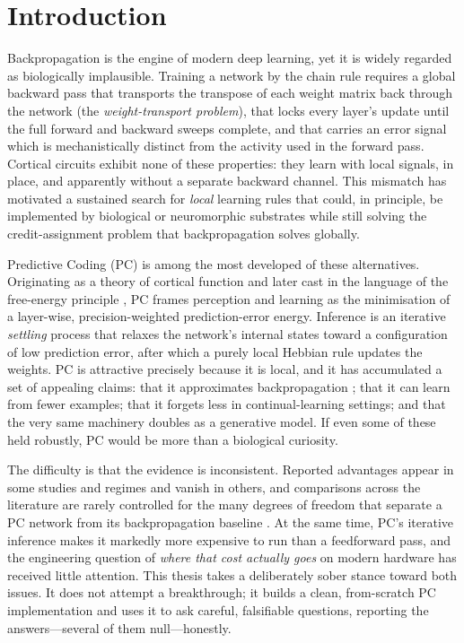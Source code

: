 \chapter{Introduction}\label{ch:intro}

Backpropagation is the engine of modern deep learning, yet it is widely regarded as
biologically implausible. Training a network by the chain rule requires a global backward pass
that transports the transpose of each weight matrix back through the network (the
\emph{weight-transport problem}), that locks every layer's update until the full forward and
backward sweeps complete, and that carries an error signal which is mechanistically distinct
from the activity used in the forward pass. Cortical circuits exhibit none of these properties:
they learn with local signals, in place, and apparently without a separate backward channel.
This mismatch has motivated a sustained search for \emph{local} learning rules that could, in
principle, be implemented by biological or neuromorphic substrates while still solving the
credit-assignment problem that backpropagation solves globally.

Predictive Coding (PC) is among the most developed of these alternatives. Originating as a
theory of cortical function \citep{rao1999predictive} and later cast in the language of the
free-energy principle \citep{bogacz2017tutorial}, PC frames perception and learning as the
minimisation of a layer-wise, precision-weighted prediction-error energy. Inference is an
iterative \emph{settling} process that relaxes the network's internal states toward a
configuration of low prediction error, after which a purely local Hebbian rule updates the
weights. PC is attractive precisely because it is local, and it has accumulated a set of
appealing claims: that it approximates backpropagation \citep{whittington2017approximation};
that it can learn from fewer examples; that it forgets less in continual-learning settings; and
that the very same machinery doubles as a generative model. If even some of these held robustly,
PC would be more than a biological curiosity.

The difficulty is that the evidence is inconsistent. Reported advantages appear in some studies
and regimes and vanish in others, and comparisons across the literature are rarely controlled
for the many degrees of freedom that separate a PC network from its backpropagation baseline
\citep{zahid2023curvature}. At the same time, PC's iterative inference makes it markedly more
expensive to run than a feedforward pass, and the engineering question of \emph{where that cost
actually goes} on modern hardware has received little attention. This thesis takes a deliberately
sober stance toward both issues. It does not attempt a breakthrough; it builds a clean,
from-scratch PC implementation and uses it to ask careful, falsifiable questions, reporting the
answers---several of them null---honestly.

